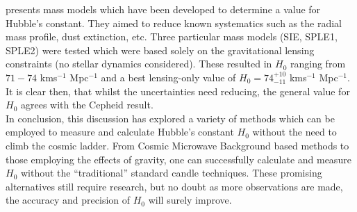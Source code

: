 \documentclass[12pt, onecolumn]{revtex4}    %
\begin{document}
\cite{2003ApJ...599...70K} presents mass models which have been developed to determine a value for Hubble's constant. They aimed to reduce known systematics such as the radial mass profile, dust extinction, etc. Three particular mass models (SIE, SPLE1, SPLE2) were tested which were based solely on the gravitational lensing constraints (no stellar dynamics considered). These resulted in $H_0$ ranging from $71-74$ kms$^{-1}$ Mpc$^{-1}$ and a best lensing-only value of $H_0=74^{+10}_{-11}$ kms$^{-1}$ Mpc$^{-1}$. It is clear then, that whilst the uncertainties need reducing, the general value for $H_0$ agrees with the Cepheid result. \\




In conclusion, this discussion has explored a variety of methods which can be employed to measure and calculate Hubble's constant $H_0$ without the need to climb the cosmic ladder. From Cosmic Microwave Background based methods to those employing the effects of gravity, one can successfully calculate and measure $H_0$ without the ``traditional'' standard candle techniques. These promising alternatives still require research, but no doubt as more observations are made, the accuracy and precision of $H_0$ will surely improve. 

\newpage





\newpage
\end{document}
